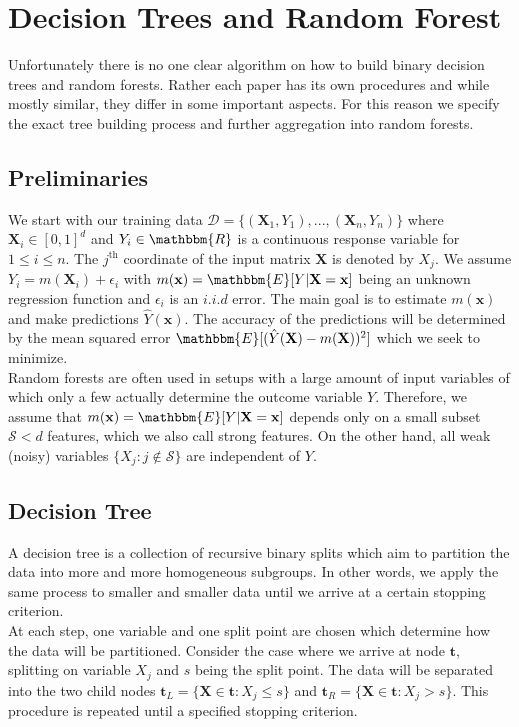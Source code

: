 \par{
\section{Decision Trees and Random Forest}

Unfortunately there is no one clear algorithm on how to build binary decision trees and random forests. Rather each paper has its own procedures and while mostly similar, they differ in some important aspects. For this reason we specify the exact tree building process and further aggregation into random forests. 

\subsection{Preliminaries}

We start with our training data $\mathcal{D} = \{(\mathbf{X}_1, Y_1), ..., (\mathbf{X}_n, Y_n)\}$ where $\mathbf{X}_i \in [0, 1]^d$ and $Y_i \in \mathbbm{R}$ is a continuous response variable for $1 \leq i \leq n$. The $j^{\text{th}}$ coordinate of the input matrix $\mathbf{X}$ is denoted by $X_j$. We assume $Y_i = m(\mathbf{X}_i) + \epsilon_i$ with $m(\mathbf{x}) = \mathbbm{E}[Y | \mathbf{X} = \mathbf{x}]$ being an unknown regression function and $\epsilon_i$ is an $i.i.d$ error. The main goal is to estimate $m(\mathbf{x})$ and make predictions $\hat{Y}(\mathbf{x})$. The accuracy of the predictions will be determined by the mean squared error $\mathbbm{E}[(\hat{Y}(\mathbf{X}) - m(\mathbf{X}))^2]$ which we seek to minimize. \\
Random forests are often used in setups with a large amount of input variables of which only a few actually determine the outcome variable $Y$. Therefore, we assume that $m(\mathbf{x}) = \mathbbm{E}[Y | \mathbf{X} = \mathbf{x}]$ depends only on a small subset $\mathcal{S} < d$ features, which we also call strong features. On the other hand, all weak (noisy) variables $\{X_j: j \notin \mathcal{S} \}$ are independent of $Y$.

\subsection{Decision Tree}
A decision tree is a collection of recursive binary splits which aim to partition the data into more and more homogeneous subgroups. In other words, we apply the same process to smaller and smaller data until we arrive at a certain stopping criterion. \\
At each step, one variable and one split point are chosen which determine how the data will be partitioned. Consider the case where we arrive at node $\mathbf{t}$, splitting on variable $X_j$ and $s$ being the split point. The data will be separated into the two child nodes $\mathbf{t}_L = \{ \mathbf{X} \in \mathbf{t}: X_j \leq s \}$ and $\mathbf{t}_R = \{ \mathbf{X} \in \mathbf{t}: X_j > s \}$. This procedure is repeated until a specified stopping criterion. \\

}
